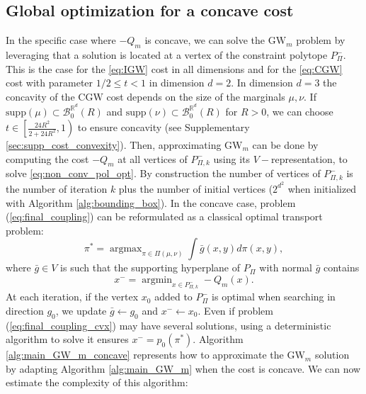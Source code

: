 \documentclass{article}
\newcommand{\R}{\mathbb{R}}
\newcommand{\B}{\mathcal{B}}
\newcommand{\1}{\mathbf{1}}
\newcommand{\CGW}{\mathrm{CGW}}
\newcommand{\GW}{\mathrm{GW}}
\DeclareMathOperator*{\argmax}{argmax}
\DeclareMathOperator*{\argmin}{argmin}
\theoremstyle{definition}
\theoremstyle{remark}
\begin{document}
\subsection{Global optimization for a concave cost}\label{sec:algo_glob_concave}

In the specific case where  $-Q_m$ is concave, we can solve the $\GW_m$ problem by leveraging that a solution is located at a vertex of the constraint polytope $P_{\Pi}^-$. This is the case for the \ref{eq:IGW} cost in all dimensions and for the \ref{eq:CGW} cost with parameter $1/2\leq t<1$ in dimension $d=2$. In dimension  $d=3$ the concavity of the $\CGW$ cost depends on the size of the marginals $\mu,\nu$. If  $\mathrm{supp}(\mu)\subset \B_0^{\R^d}(R)$ and $\mathrm{supp}(\nu)\subset \B_0^{\R^d}(R)$ for $R>0$, we can choose  $t \in  \left[\frac{24R^2}{2+24R^2},1\right)$ to ensure concavity (see Supplementary \ref{sec:supp_cost_convexity}). Then, approximating $\GW_m$ can be done by computing the cost $-Q_m$ at all vertices of  $P_{\Pi,k}^-$ using its $V-$representation, to solve  \eqref{eq:non_conv_pol_opt}. By construction the number of vertices of $P_{\Pi,k}^-$ is the number of iteration $k$ plus the number of initial vertices ($2^{d^2}$ when initialized with Algorithm \ref{alg:bounding_box}). In the concave case, problem (\ref{eq:final_coupling}) can be reformulated as a classical optimal transport problem:
\begin{equation}\label{eq:final_coupling_cvx}
    \pi^*= \argmax_{\pi\in\Pi(\mu,\nu)}\int \bar{g}(x,y)d\pi(x,y),
\end{equation} where $\bar{g}\in V$ is such that the supporting hyperplane of $P_\Pi$ with normal $\bar{g}$ contains \[x^-=\argmin_{x\in P_{\Pi,k}^-}-Q_m(x).\] At each iteration, if the vertex $x_0$ added to $P_{\Pi}^-$ is optimal when searching in direction $g_0$, we update $\bar{g} \gets g_0 $ and $x^-\gets x_0$. Even if problem (\ref{eq:final_coupling_cvx}) may have several solutions, using a deterministic algorithm to solve it ensures $x^-=p_0(\pi^*)$.  Algorithm \ref{alg:main_GW_m_concave} represents how to approximate the $\GW_m$ solution by adapting Algorithm \ref{alg:main_GW_m} when the cost is concave. We can now estimate the complexity of this algorithm:
\end{document}

